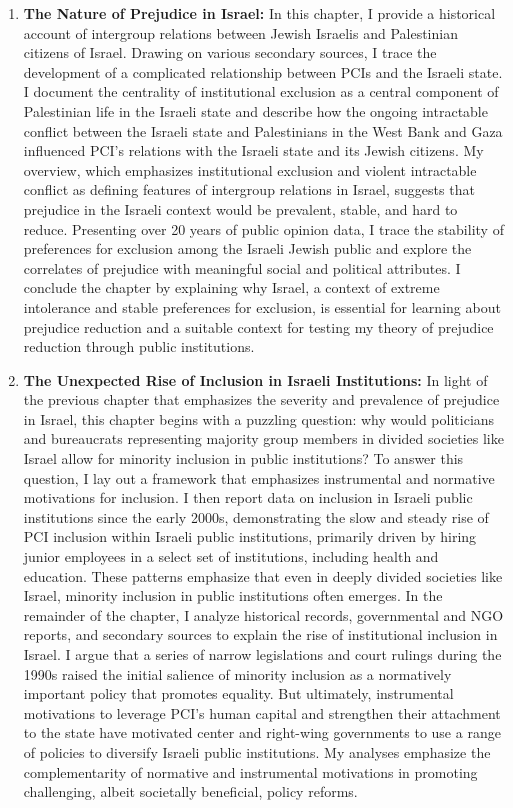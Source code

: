 \documentclass[12pt]{article}
\theoremstyle{plain}
\begin{document}
\begin{enumerate}
\item \textbf{The Nature of Prejudice in Israel:} In this chapter, I provide a historical account of intergroup relations between Jewish Israelis and Palestinian citizens of Israel. Drawing on various secondary sources, I trace the development of a complicated relationship between PCIs and the Israeli state. I document the centrality of institutional exclusion as a central component of Palestinian life in the Israeli state and describe how the ongoing intractable conflict between the Israeli state and Palestinians in the West Bank and Gaza influenced PCI's relations with the Israeli state and its Jewish citizens. My overview, which emphasizes institutional exclusion and violent intractable conflict as defining features of intergroup relations in Israel, suggests that prejudice in the Israeli context would be prevalent, stable, and hard to reduce. Presenting over 20 years of public opinion data, I trace the stability of preferences for exclusion among the Israeli Jewish public and explore the correlates of prejudice with meaningful social and political attributes. I conclude the chapter by explaining why Israel, a context of extreme intolerance and stable preferences for exclusion, is essential for learning about prejudice reduction and a suitable context for testing my theory of prejudice reduction through public institutions.


\item \textbf{The Unexpected Rise of Inclusion in Israeli Institutions:} In light of the previous chapter that emphasizes the severity and prevalence of prejudice in Israel, this chapter begins with a puzzling question: why would politicians and bureaucrats representing majority group members in divided societies like Israel allow for minority inclusion in public institutions? To answer this question, I lay out a framework that emphasizes instrumental and normative motivations for inclusion. I then report data on inclusion in Israeli public institutions since the early 2000s, demonstrating the slow and steady rise of PCI inclusion within Israeli public institutions, primarily driven by hiring junior employees in a select set of institutions, including health and education. These patterns emphasize that even in deeply divided societies like Israel, minority inclusion in public institutions often emerges. In the remainder of the chapter, I analyze historical records, governmental and NGO reports, and secondary sources to explain the rise of institutional inclusion in Israel. I argue that a series of narrow legislations and court rulings during the 1990s raised the initial salience of minority inclusion as a normatively important policy that promotes equality. But ultimately, instrumental motivations to leverage PCI's human capital and strengthen their attachment to the state have motivated center and right-wing governments to use a range of policies to diversify Israeli public institutions. My analyses emphasize the complementarity of normative and instrumental motivations in promoting challenging, albeit societally beneficial, policy reforms.




\end{enumerate}
\end{document}
